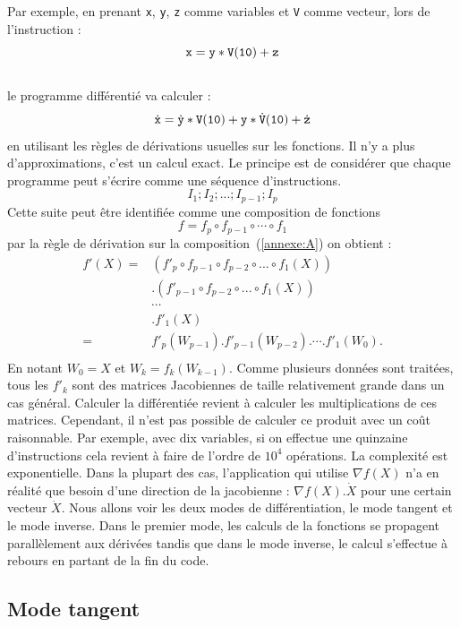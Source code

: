 Par exemple, en prenant {\tt x}, {\tt y}, {\tt z} comme variables et {\tt V} comme vecteur,
lors de l'instruction :\\
$${\tt x= y*V(10)+z}$$\\
le programme diff\'erenti\'e va  calculer :
$$\dot{\tt x}= \dot{\tt y}*{\tt V(10)} + {\tt y}*\dot{\tt V}{\tt(10)}+\dot{\tt z} $$
en utilisant les r\`egles de d\'erivations usuelles sur les fonctions. Il n'y a plus
d'approximations, c'est un calcul exact. 
Le principe est de consid\'erer que chaque programme peut s'\'ecrire comme une s\'equence
d'instructions.
$$I_1;I_2;...;I_{p-1};I_{p}$$
Cette suite peut être identifi\'ee comme une composition de fonctions 
$$f=f_p\circ f_{p-1} \circ \cdots \circ f_1$$
par la r\`egle de d\'erivation sur la composition~(\ref{annexe:A}) on obtient :\\

\begin{align*}
f'(X) = & (f'_p\circ f_{p-1} \circ f_{p-2} \circ ... \circ f_1(X))\\
& . (f'_{p-1} \circ f_{p-2} \circ ... \circ f_1(X))\\
& \cdots\\
& . f'_1(X)\\
= & f'_p(W_{p-1}) . f'_{p-1}(W_{p-2}) . \cdots .f'_1(W_0).\\
\end{align*}
En notant $W_0=X$ et $W_k=f_k(W_{k-1})$.
%
Comme plusieurs donn\'ees sont trait\'ees, tous les $f'_k$ sont des matrices Jacobiennes de 
taille relativement grande dans un cas g\'en\'eral. Calculer la diff\'erenti\'ee revient \`a calculer
les multiplications de ces matrices. Cependant, il n'est pas possible de calculer ce produit avec un co\^ut 
raisonnable. Par exemple, avec dix variables, si on effectue une quinzaine d'instructions
cela revient \`a faire de l'ordre de $10^4$ op\'erations. La complexit\'e est exponentielle. Dans la plupart
des cas, l'application qui utilise $\nabla f(X)$  n'a en r\'ealit\'e que besoin d'une direction de la jacobienne :
 $\nabla f(X).\dot{X}$ pour une certain vecteur $\dot{X}$.
Nous allons voir les deux modes de diff\'erentiation, le mode tangent et le mode inverse. Dans le premier mode, 
les calculs de la fonctions se propagent parall\`element aux d\'eriv\'ees tandis que dans le mode inverse, le calcul
s'effectue \`a rebours en partant de la fin du code.







    \subsection{Mode tangent}

